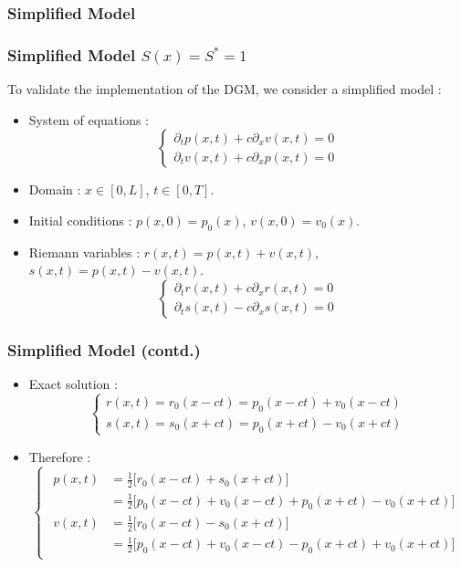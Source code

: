 \documentclass[11pt]{beamer}
\newcommand{\slideTitle}[1]{\begin{frame}\frametitle{#1}}
\begin{document}
\subsubsection{Simplified Model}
\slideTitle{Simplified Model $S(x)=S^*=1$}
To validate the implementation of the DGM, we consider a simplified model :
\begin{itemize}
    \item System of equations :
    \begin{equation}
        \begin{cases}
            \partial_t p(x,t) + c\partial_x v(x,t) = 0 \\
            \partial_t v(x,t) + c\partial_x p(x,t) = 0
        \end{cases}
    \end{equation}
    \item Domain : $x \in [0,L]$, $t \in [0,T]$.
    \item Initial conditions : $p(x,0) = p_0(x)$, $v(x,0) = v_0(x)$.
    \item Riemann variables : $r(x,t) = p(x,t) + v(x,t)$, $s(x,t) = p(x,t) - v(x,t)$.
    \begin{equation}
        \begin{cases}
            \partial_t r(x,t) + c\partial_x r(x,t) = 0 \\
            \partial_t s(x,t) - c\partial_x s(x,t) = 0
        \end{cases}
    \end{equation}
\end{itemize}
\end{frame}

\slideTitle{Simplified Model (contd.)}
\begin{itemize}
    \item Exact solution :
    \begin{equation}
        \begin{cases}
            r(x,t) = r_0(x-ct) = p_0(x-ct) + v_0(x-ct) \\
            s(x,t) = s_0(x+ct) = p_0(x+ct) - v_0(x+ct)
        \end{cases}
    \end{equation}
    \item Therefore :
    \begin{equation}
        \begin{cases}
            \begin{aligned}
            p(x,t) &= \tfrac12\bigl[r_0(x-ct) + s_0(x+ct)\bigr] \\
            &= \tfrac12\bigl[p_0(x-ct) + v_0(x-ct) + p_0(x+ct) - v_0(x+ct)\bigr] \\
            v(x,t) &= \tfrac12\bigl[r_0(x-ct) - s_0(x+ct)\bigr] \\
            &= \tfrac12\bigl[p_0(x-ct) + v_0(x-ct) - p_0(x+ct) + v_0(x+ct)\bigr]
            \end{aligned}
        \end{cases}
    \end{equation}
\end{itemize}
\end{frame}
\end{document}
